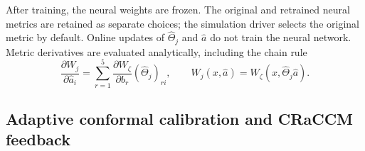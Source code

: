 \documentclass[11pt]{article}
\begin{document}
After training, the neural weights are frozen. The original and retrained
neural metrics are retained as separate choices; the simulation driver
selects the original metric by default. Online updates of
$\hat\Theta_j$ and $\hat a$ do not train the neural network.
Metric derivatives are evaluated analytically, including the chain rule
\begin{equation}
    \frac{\partial W_j}{\partial\hat a_i}
    =\sum_{r=1}^{5}\frac{\partial W_\zeta}{\partial b_r}
      (\hat\Theta_j)_{ri},\qquad
    W_j(x,\hat a)=W_\zeta(x,\hat\Theta_j\hat a).
\end{equation}

\subsection{Adaptive conformal calibration and CRaCCM feedback}
\end{document}
